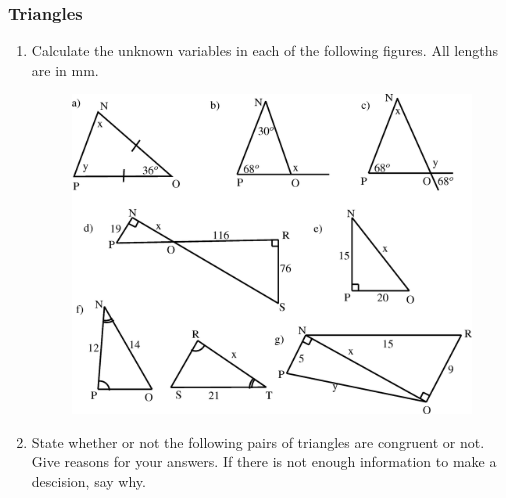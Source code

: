             \subsubsection{  Triangles }
            \nopagebreak
          \label{m39368*id318528}\begin{enumerate}[noitemsep, label=\textbf{\arabic*}. ] 
            \label{m39368*uid50}\item Calculate the unknown variables in each of the following figures. All
lengths are in mm.
    \setcounter{subfigure}{0}
	\begin{figure}[H] %
    \begin{center}
    \label{m39368*id318548!!!underscore!!!media}\label{m39368*id318548!!!underscore!!!printimage}\includegraphics{col11306.imgs/m39368_MG10C13_038.png} %
      \vspace{2pt}
    \vspace{.1in}
    \end{center}
 \end{figure}               \label{m39368*uid51}\item State whether or not the following pairs of triangles are congruent or not.
Give reasons for your answers. If there is not enough information to make a
descision, say why.
    \setcounter{subfigure}{0}
	\begin{figure}[H] %
    \begin{center}

\end{center}
\end{figure}
\end{enumerate}
